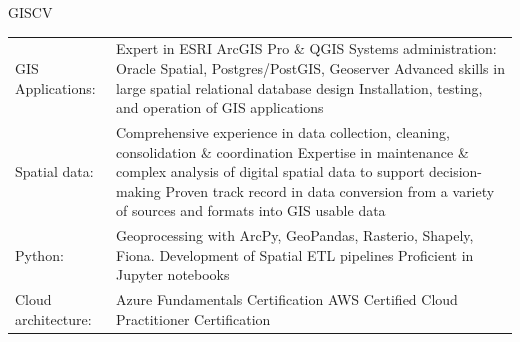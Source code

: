\documentclass[letterpaper]{article}
\newenvironment{skillslist}
        {
            \begin{tabular}[t]{ l L{5.17in} }
        }{
            \end{tabular}
        }
\begin{document}
    \begin{taggedblock}{GISCV}
        \begin{skillslist}
            GIS Applications:&
                Expert in ESRI ArcGIS Pro \& QGIS \linebreak
                Systems administration: Oracle Spatial, Postgres/PostGIS, Geoserver \linebreak
                Advanced skills in large spatial relational database design \linebreak
                Installation, testing, and operation of GIS applications \linebreak
                \\
            Spatial data:&
                Comprehensive experience in data collection, cleaning, consolidation \& coordination \linebreak
                Expertise in maintenance \& complex analysis of digital spatial data to support decision-making \linebreak
                Proven track record in data conversion from a variety of sources and formats into GIS usable data \linebreak
                \\
            Python:&
                Geoprocessing with ArcPy, GeoPandas, Rasterio, Shapely, Fiona. \linebreak
                Development of Spatial ETL pipelines \linebreak
                Proficient in Jupyter notebooks \linebreak
                \\
            Cloud architecture:&
                Azure Fundamentals Certification \linebreak
                AWS Certified Cloud Practitioner Certification \linebreak

\end{skillslist}
\end{taggedblock}
\end{document}
